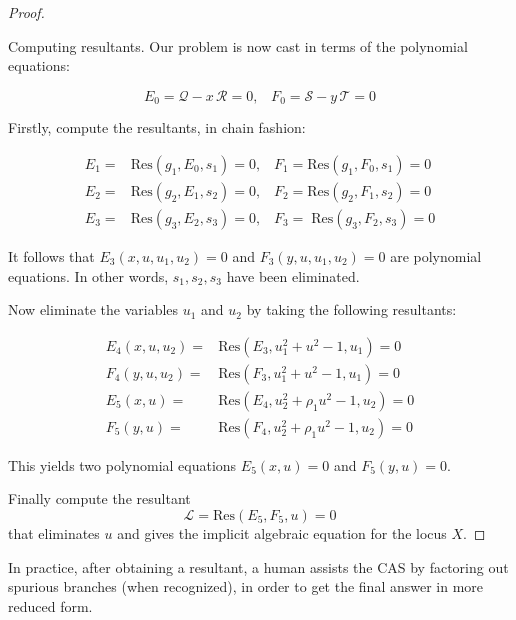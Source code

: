 \begin{proof}
\begin{step}
Computing resultants.
Our problem is now cast in terms of the polynomial equations:

\begin{equation*}
E_0= \mathcal{Q}-x\,\mathcal{R}=0,\;\;\; F_0= \mathcal{S}-y\,\mathcal{T}=0
\end{equation*}

\end{step}

Firstly, compute the resultants, in chain fashion:  

\begin{align*}
    E_1=&\textrm{Res}(g_1,E_0,s_1)=0,\;\;\;F_1=\textrm{Res}(g_1,F_0,s_1)=0\\
	E_2=&\textrm{Res}(g_2,E_1,s_2)=0,\;\;\;F_2=\textrm{Res}(g_2,F_1,s_2)=0\\
	E_3=&\textrm{Res}(g_3,E_2,s_3)=0,\;\;\;F_3=\;\textrm{Res}(g_3,F_2,s_3)=0
\end{align*}
		 
It follows that  $E_3(x,u,u_1,u_2)=0$ and $F_3(y,u,u_1,u_2)=0$ are polynomial
equations. In other words, $s_1, s_2, s_3$ have been eliminated. 

Now  eliminate the variables $u_1$ and $u_2$ by taking the following resultants:

\begin{align*}
	E_4(x,u,u_2)=&\textrm{Res}(E_3,u_1^2+u^2-1,u_1)=0\\ 	F_4(y,u,u_2)=&\textrm{Res}(F_3,u_1^2+u^2-1,u_1)=0\\
	E_5(x,u)=&\textrm{Res}(E_4,u_2^2+\rho_1 u^2-1,u_2)=0\\
	F_5(y,u)=&\textrm{Res}(F_4,u_2^2+\rho_1 u^2-1,u_2)=0
\end{align*}

This yields two polynomial equations $E_5(x,u)=0$ and $F_5(y,u)=0$. 

Finally compute the resultant
$$ {\mathcal L} = \textrm{Res}(E_5,F_5,u)=0
$$
that eliminates $u$ and gives  the implicit algebraic equation for the locus $X$. 
\end{proof}

\begin{remark}
In practice,  after  obtaining  a resultant, a human assists the CAS by factoring out spurious branches
(when recognized), in order to get the final answer in more reduced form.   
\end{remark}

